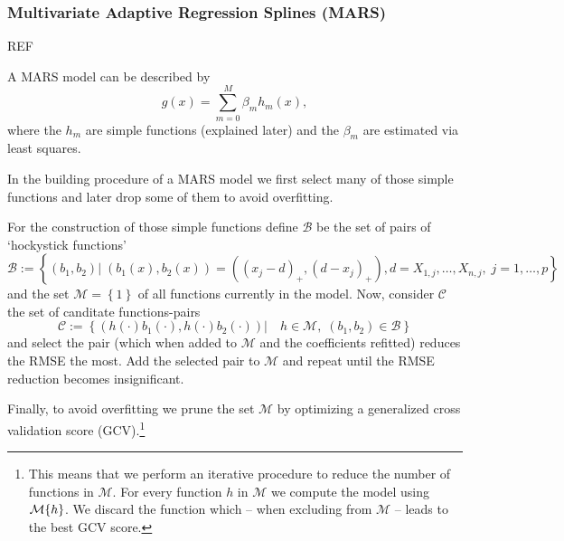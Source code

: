 \subsubsection*{Multivariate Adaptive Regression Splines (MARS)}{
    REF\cite{friedmanMultivariateAdaptiveRegression1991}

    A MARS model can be described by 
    \begin{equation}
        \label{eq:mars}
        g(x) = \sum_{m=0}^M \beta_m h_m(x),
    \end{equation}
    where the $h_m$ are simple functions (explained later) and the $\beta_m$ are estimated via least squares. 
    
    In the building procedure of a MARS model we first select many of those simple functions and later drop some of them to avoid overfitting. 
    
    For the construction of those simple functions define $\mathcal{B}$ be the set of pairs of `hockystick functions'
    \begin{equation}
        \label{eq:mars_basis_fun}
        \mathcal{B}:=\left\{
            \left(b_1,b_2\right) 
            | \;
            \left(b_1(x),b_2(x)\right) = \left(\left(x_{j}-d\right)_+,\left(d-x_{j}\right)_+\right),
            d =X_{1, j},  \ldots, X_{n, j},\;
            j=1, \ldots, p
        \right\}
    \end{equation}
    and the set $\mathcal{M}=\left\{1\right\}$ of all functions currently in the model. Now, consider $\mathcal{C}$ the set of canditate functions-pairs 
    \begin{equation}
        \label{eq:mars_candidate}
        \mathcal{C}:=\left\{
            \left(h(\cdot)b_1(\cdot),  h(\cdot)b_2(\cdot) \right)
            | \quad h\in\mathcal{M}, \; 
            (b_1,b_2) \in \mathcal{B}
        \right\}
    \end{equation}
    and select the pair (which when added to $\mathcal{M}$ and the coefficients refitted) reduces the RMSE the most. Add the selected pair to $\mathcal{M}$ and repeat until the RMSE reduction becomes insignificant.

    Finally, to avoid overfitting we prune the set $\mathcal{M}$ by optimizing a generalized cross validation score (GCV).\footnote{This means that we perform an iterative procedure to reduce the number of functions in $\mathcal{M}$. For every function $h$ in $\mathcal{M}$ we compute the model using $\mathcal{M}\\\{h\}$. We discard the function which -- when excluding from $\mathcal{M}$ -- leads to the best GCV score.}  

}
